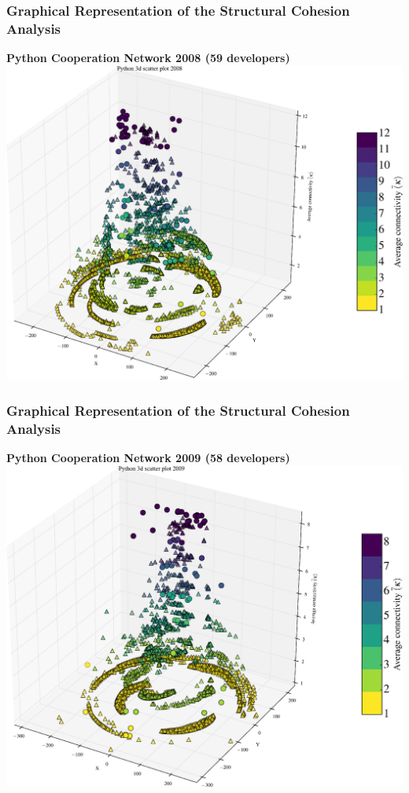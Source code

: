 \documentclass[ignorenonframetext,red,8pt,notes=hide]{beamer}
\begin{document}
\begin{frame}
\frametitle{Graphical Representation of the Structural Cohesion Analysis}

\begin{center}
\textbf{Python Cooperation Network 2008 (59 developers)}
\includegraphics[scale=0.25]{img/3d_scatter_python_2008}
\end{center}

\end{frame}

\begin{frame}
\frametitle{Graphical Representation of the Structural Cohesion Analysis}

\begin{center}
\textbf{Python Cooperation Network 2009 (58 developers)}
\includegraphics[scale=0.25]{img/3d_scatter_python_2009}
\end{center}

\end{frame}
\end{document}
